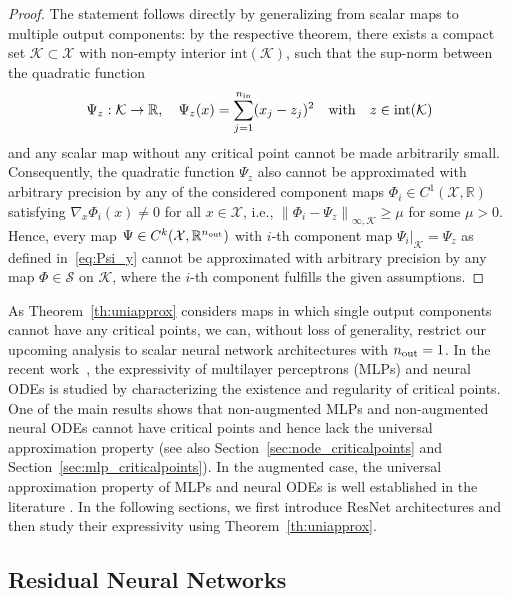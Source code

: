 \documentclass[10pt]{article}
\theoremstyle{definition}
\numberwithin{equation}{section}
\newcommand\norm[1]{\left\lVert#1\right\rVert}
\newcommand{\R}{\mathbb{R}}
\newcommand*{\nout}{n_\textup{out}}
\newcommand*{\nin}{n_\textup{in}}
\begin{document}
\begin{proof}
	The statement follows directly by generalizing \cite[Theorem 2.6]{kk2025} from scalar maps to multiple output components: by the respective theorem, there exists a compact set $\mathcal{K}\subset \mathcal{X}$ with non-empty interior $\text{int}(\mathcal{K})$, such that the sup-norm between the quadratic function 
	\begin{equation} \label{eq:Psi_y}
		\Psi_z: \mathcal{K}\rightarrow \R, \quad \Psi_z(x) = \sum_{j = 1}^{\nin}(x_j-z_j)^2 \quad \text{with} \quad z\in \text{int}(\mathcal{K})
	\end{equation}
	and any scalar map without any critical point cannot be made arbitrarily small. Consequently, the quadratic function $\Psi_z$ also cannot be approximated with arbitrary precision by any of the considered component maps $\Phi_i \in C^1(\mathcal{X},\R)$ satisfying $\nabla_x\Phi_i(x) \neq 0$ for all $x\in \mathcal{X}$, i.e., $\norm{\Phi_i-\Psi_z}_{\infty,\mathcal{K}} \geq \mu $ for some $\mu>0$. Hence, every map $\Psi \in C^k(\mathcal{X},\R^{\nout})$ with $i$-th component map $\Psi_i \vert_{\mathcal{K}} = \Psi_z$ as defined in~\eqref{eq:Psi_y} cannot be approximated with arbitrary precision by any map $\Phi \in \mathcal{S}$ on $\mathcal{K}$, where the $i$-th component fulfills the given assumptions.
\end{proof}

As Theorem~\ref{th:uniapprox} considers maps in which single output components cannot have any critical points, we can, without loss of generality, restrict our upcoming analysis to scalar neural network architectures with $\nout = 1$.
In the recent work~\cite{kk2025}, the expressivity of multilayer perceptrons (MLPs) and neural ODEs is studied by characterizing the existence and regularity of critical points. One of the main results shows that non-augmented MLPs and non-augmented neural ODEs cannot have critical points and hence lack the universal approximation property (see also Section~\ref{sec:node_criticalpoints} and Section~\ref{sec:mlp_criticalpoints}). In the augmented case, the universal approximation property of MLPs and neural ODEs is well established in the literature \cite{Dupont2019,Hornik1989,Hornik1991,Kidger2022,Pinkus1999,Zhang2020a}.
In the following sections, we first introduce ResNet architectures and then study their expressivity using Theorem~\ref{th:uniapprox}. 


\subsection{Residual Neural Networks}
\label{sec:resnet_model}
\end{document}
